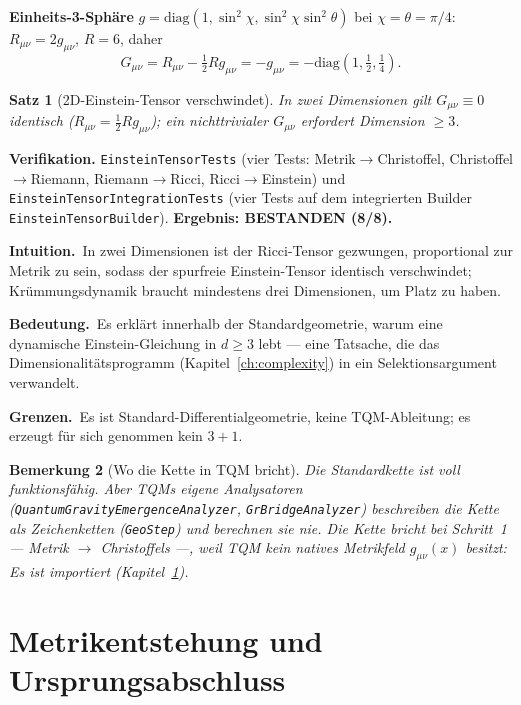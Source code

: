 \documentclass[10pt,twoside,openany]{book}
\newtheorem{theorem}{Satz}[chapter]
\newtheorem{remark}[theorem]{Bemerkung}
\newcommand{\theoremnotes}[3]{%
  \par\medskip\noindent
  \textbf{Intuition.}\ #1\par
  \textbf{Bedeutung.}\ #2\par
  \textbf{Grenzen.}\ #3\par}
\begin{document}
\textbf{Einheits-3-Sphäre} $g=\mathrm{diag}(1,\sin^2\chi,\sin^2\chi\sin^2\theta)$ bei
$\chi=\theta=\pi/4$: $R_{\mu\nu}=2g_{\mu\nu}$, $R=6$, daher
\begin{equation}
G_{\mu\nu} = R_{\mu\nu} - \tfrac12 R g_{\mu\nu} = -g_{\mu\nu}
= -\mathrm{diag}(1,\tfrac12,\tfrac14).
\end{equation}

\begin{theorem}[2D-Einstein-Tensor verschwindet]
In zwei Dimensionen gilt $G_{\mu\nu}\equiv0$ identisch
($R_{\mu\nu}=\tfrac12 R g_{\mu\nu}$); ein nichttrivialer $G_{\mu\nu}$ erfordert Dimension
$\ge3$.
\end{theorem}

\textbf{Verifikation.} \texttt{EinsteinTensorTests} (vier Tests:
Metrik$\to$Christoffel, Christoffel$\to$Riemann, Riemann$\to$Ricci,
Ricci$\to$Einstein) und \texttt{EinsteinTensorIntegrationTests} (vier Tests auf dem
integrierten Builder \texttt{EinsteinTensorBuilder}). \textbf{Ergebnis: BESTANDEN (8/8).}

\theoremnotes
{In zwei Dimensionen ist der Ricci-Tensor gezwungen, proportional zur Metrik zu sein,
sodass der spurfreie Einstein-Tensor identisch verschwindet; Krümmungsdynamik braucht
mindestens drei Dimensionen, um Platz zu haben.}
{Es erklärt innerhalb der Standardgeometrie, warum eine dynamische Einstein-Gleichung in
$d\ge3$ lebt --- eine Tatsache, die das Dimensionalitätsprogramm
(Kapitel~\ref{ch:complexity}) in ein Selektionsargument verwandelt.}
{Es ist Standard-Differentialgeometrie, keine TQM-Ableitung; es erzeugt für sich genommen
kein $3{+}1$.}

\begin{remark}[Wo die Kette in TQM bricht]
Die Standardkette ist voll funktionsfähig. Aber TQMs eigene Analysatoren
(\texttt{QuantumGravityEmergenceAnalyzer}, \texttt{GrBridgeAnalyzer}) \emph{beschreiben}
die Kette als Zeichenketten (\texttt{GeoStep}) und \emph{berechnen} sie nie. Die Kette
bricht bei Schritt~1 — \emph{Metrik} $\to$ \emph{Christoffels} —, weil TQM kein natives
Metrikfeld $g_{\mu\nu}(x)$ besitzt: Es ist importiert
(Kapitel~\ref{ch:metric-emergence}).
\end{remark}


\chapter{Metrikentstehung und Ursprungsabschluss}
\label{ch:metric-emergence}
\end{document}
